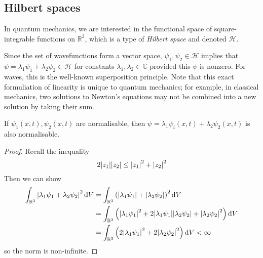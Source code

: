 \subsection{Hilbert spaces}
In quantum mechanics, we are interested in the functional space of square-integrable functions on \( \mathbb R^3 \), which is a type of \textit{Hilbert space} and denoted \( \mathcal H \).
\begin{remark}
	Since the set of wavefunctions form a vector space, \( \psi_1, \psi_2 \in \mathcal H \) implies that \( \psi = \lambda_1 \psi_1 + \lambda_2 \psi_2 \in \mathcal H \) for constants \( \lambda_1, \lambda_2 \in \mathbb C \) provided this \( \psi \) is nonzero.
	For waves, this is the well-known superposition principle.
	Note that this exact formuliation of linearity is unique to quantum mechanics; for example, in classical mechanics, two solutions to Newton's equations may not be combined into a new solution by taking their sum.
\end{remark}
\begin{proposition}
	If \( \psi_1(x,t), \psi_2(x,t) \) are normalisable, then \( \psi = \lambda_1 \psi_i(x,t) + \lambda_2 \psi_2(x,t) \) is also normalisable.
\end{proposition}
\begin{proof}
	Recall the inequality
	\[
		2 \abs{z_1} \abs{z_2} \leq \abs{z_1}^2 + \abs{z_2}^2
	\]
	Then we can show
	\begin{align*}
		\int_{\mathbb R^3}\abs{\lambda_1 \psi_1 + \lambda_2 \psi_2}^2 \dd{V} & = \int_{\mathbb R^3}\qty(\abs{\lambda_1 \psi_1} + \abs{\lambda_2 \psi_2})^2 \dd{V}                                                   \\
		                                                                     & = \int_{\mathbb R^3}\qty(\abs{\lambda_1 \psi_1}^2 + 2\abs{\lambda_1 \psi_1}\abs{\lambda_2 \psi_2} + \abs{\lambda_2 \psi_2}^2) \dd{V} \\
		                                                                     & = \int_{\mathbb R^3}\qty(2\abs{\lambda_1 \psi_1}^2 + 2\abs{\lambda_2 \psi_2}^2) \dd{V} < \infty                                      \\
	\end{align*}
	so the norm is non-infinite.
\end{proof}

